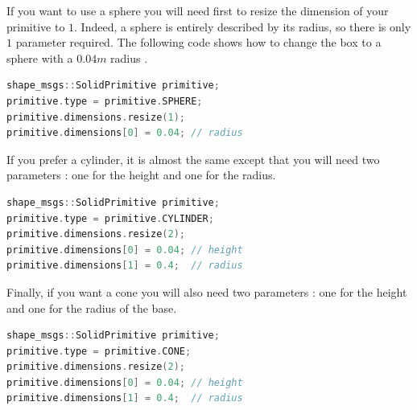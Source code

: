 If you want to use a sphere you will need first to resize the dimension of your primitive to $1$. Indeed, a sphere is entirely described by its radius, so there is only $1$ parameter required. The following code shows how to change the box to a sphere with a $0.04m$ radius .

\begin{lstlisting}[language=c++]
shape_msgs::SolidPrimitive primitive;
primitive.type = primitive.SPHERE;
primitive.dimensions.resize(1);
primitive.dimensions[0] = 0.04; // radius
\end{lstlisting}

If you prefer a cylinder, it is almost the same except that you will need two parameters : one for the height and one for the radius.


\begin{lstlisting}[language=c++]
shape_msgs::SolidPrimitive primitive;
primitive.type = primitive.CYLINDER;
primitive.dimensions.resize(2);
primitive.dimensions[0] = 0.04; // height
primitive.dimensions[1] = 0.4;  // radius
\end{lstlisting}

Finally,  if you want a cone you will also need two parameters : one for the height and one for the radius of the base.

\begin{lstlisting}[language=c++]
shape_msgs::SolidPrimitive primitive;
primitive.type = primitive.CONE;
primitive.dimensions.resize(2);
primitive.dimensions[0] = 0.04; // height
primitive.dimensions[1] = 0.4;  // radius
\end{lstlisting}